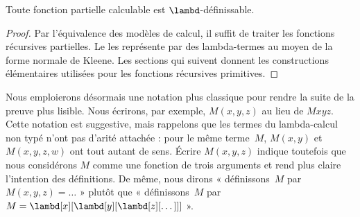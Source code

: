 \documentclass[../../../include/open-logic-section]{subfiles}
\begin{document}

\begin{thm}
Toute fonction partielle calculable est
$\lambd$-définissable.
\end{thm}

\begin{proof}
Par l'équivalence des modèles de calcul, il suffit de traiter les
fonctions récursives partielles. Le
 les représente
par des lambda-termes au moyen de la forme normale de Kleene.
Les sections qui suivent donnent les constructions élémentaires
utilisées pour les fonctions récursives primitives.
\end{proof}

Nous emploierons désormais une notation plus
classique pour rendre la suite de la preuve plus
lisible. Nous écrirons, par exemple, $M(x,y,z)$
au lieu de $Mxyz$. Cette notation est suggestive,
mais rappelons que les termes du lambda-calcul non
typé n'ont pas d'arité attachée : pour le même terme~$M$,
$M(x,y)$ et $M(x,y,z,w)$ ont tout autant de sens.
Écrire $M(x,y,z)$ indique toutefois que nous considérons
$M$ comme une fonction de trois arguments et rend plus
claire l'intention des définitions. De même, nous dirons
« définissons~$M$ par $M(x,y,z)=\dots$ » plutôt que
« définissons~$M$ par
$M=\lambd[x][\lambd[y][\lambd[z][\dots]]]$ ».
\end{document}

